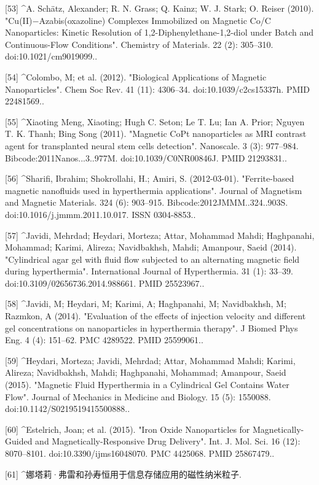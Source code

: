 [53]
^A. Schätz, Alexander; R. N. Grass; Q. Kainz; W. J. Stark; O. Reiser (2010). "Cu(II)−Azabis(oxazoline) Complexes Immobilized on Magnetic Co/C Nanoparticles: Kinetic Resolution of 1,2-Diphenylethane-1,2-diol under Batch and Continuous-Flow Conditions". Chemistry of Materials. 22 (2): 305–310. doi:10.1021/cm9019099..

[54]
^Colombo, M; et al. (2012). "Biological Applications of Magnetic Nanoparticles". Chem Soc Rev. 41 (11): 4306–34. doi:10.1039/c2cs15337h. PMID 22481569..

[55]
^Xiaoting Meng, Xiaoting; Hugh C. Seton; Le T. Lu; Ian A. Prior; Nguyen T. K. Thanh; Bing Song (2011). "Magnetic CoPt nanoparticles as MRI contrast agent for transplanted neural stem cells detection". Nanoscale. 3 (3): 977–984. Bibcode:2011Nanos...3..977M. doi:10.1039/C0NR00846J. PMID 21293831..

[56]
^Sharifi, Ibrahim; Shokrollahi, H.; Amiri, S. (2012-03-01). "Ferrite-based magnetic nanofluids used in hyperthermia applications". Journal of Magnetism and Magnetic Materials. 324 (6): 903–915. Bibcode:2012JMMM..324..903S. doi:10.1016/j.jmmm.2011.10.017. ISSN 0304-8853..

[57]
^Javidi, Mehrdad; Heydari, Morteza; Attar, Mohammad Mahdi; Haghpanahi, Mohammad; Karimi, Alireza; Navidbakhsh, Mahdi; Amanpour, Saeid (2014). "Cylindrical agar gel with fluid flow subjected to an alternating magnetic field during hyperthermia". International Journal of Hyperthermia. 31 (1): 33–39. doi:10.3109/02656736.2014.988661. PMID 25523967..

[58]
^Javidi, M; Heydari, M; Karimi, A; Haghpanahi, M; Navidbakhsh, M; Razmkon, A (2014). "Evaluation of the effects of injection velocity and different gel concentrations on nanoparticles in hyperthermia therapy". J Biomed Phys Eng. 4 (4): 151–62. PMC 4289522. PMID 25599061..

[59]
^Heydari, Morteza; Javidi, Mehrdad; Attar, Mohammad Mahdi; Karimi, Alireza; Navidbakhsh, Mahdi; Haghpanahi, Mohammad; Amanpour, Saeid (2015). "Magnetic Fluid Hyperthermia in a Cylindrical Gel Contains Water Flow". Journal of Mechanics in Medicine and Biology. 15 (5): 1550088. doi:10.1142/S0219519415500888..

[60]
^Estelrich, Joan; et al. (2015). "Iron Oxide Nanoparticles for Magnetically-Guided and Magnetically-Responsive Drug Delivery". Int. J. Mol. Sci. 16 (12): 8070–8101. doi:10.3390/ijms16048070. PMC 4425068. PMID 25867479..

[61]
^娜塔莉·弗雷和孙寿恒用于信息存储应用的磁性纳米粒子.


